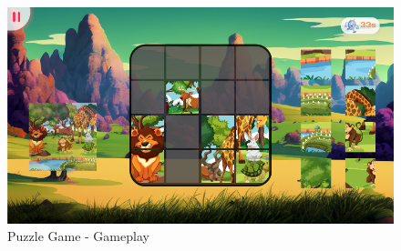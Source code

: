 \begin{figure}[H]
    \centering
    \includegraphics[width=0.9\linewidth]{Chapters/gameplay/PuzzleGame.jpg}
    \caption{Puzzle Game - Gameplay}
    \label{fig:puzzleGameplay}    
\end{figure}